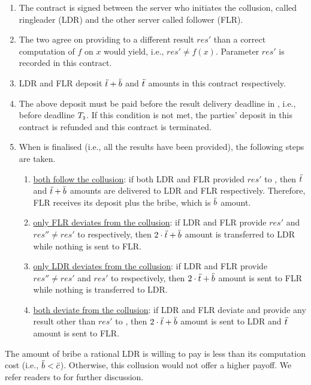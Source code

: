 \begin{enumerate}
%
\item The contract is signed between the server who initiates the collusion, called ringleader (LDR) and the other server called follower (FLR). 
%
\item The two agree on providing to \SCpc a different result $res'$ than a correct computation of $f$ on $x$ would yield, i.e., $res'\neq f(x)$. Parameter $res'$ is recorded in this contract. 
%
\item LDR and FLR deposit $\ddot{t}+\ddot{b}$ and $\ddot{t}$ amounts in this contract respectively. 
%
\item The above deposit must be paid before the result delivery deadline in \SCpc, i.e., before deadline $T_{\scriptscriptstyle 2}$. If this condition is not met, the parties' deposit in this contract is refunded and this contract is terminated. 
%
\item When \SCpc is finalised (i.e., all the results have been provided), the following steps are taken.
%
\begin{enumerate}
%
\item \underline{both follow the collusion}: if both LDR and FLR provided $res'$ to \SCpc, then $\ddot{t}$ and $\ddot{t}+\ddot{b}$ amounts are delivered to LDR and FLR respectively. Therefore, FLR receives its deposit plus the bribe, which is $\ddot{b}$ amount. 
%
\item \underline{only FLR deviates from the collusion}:  if LDR and FLR provide $res'$ and $res''\neq res'$ to \SCpc respectively, then $2\cdot \ddot{t}+\ddot{b}$ amount is transferred to LDR while nothing is sent to FLR. 
%
\item \underline{only LDR deviates from the collusion}: if LDR and FLR provide $res''\neq res'$ and $res'$ to \SCpc respectively, then $2\cdot \ddot{t}+\ddot{b}$ amount is sent to FLR while nothing is transferred to LDR.  
%
\item \underline{both deviate from the collusion}: if LDR and FLR deviate and provide any result other than $res'$ to \SCpc, then  $2\cdot \ddot{t}+\ddot{b}$ amount is sent to LDR and $\ddot{t}$ amount is sent to FLR. 
%
\end{enumerate}
%
\end{enumerate}

The amount of bribe a rational LDR is willing to pay is less than its computation cost (i.e., $\ddot{b}<\ddot{c}$). Otherwise, this collusion would not offer a higher payoff. We refer readers to \cite{dong2017betrayal} for further discussion. 






















